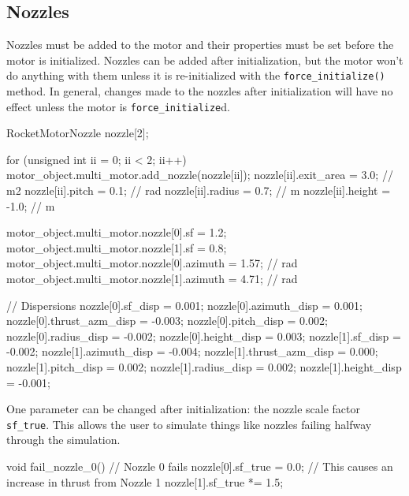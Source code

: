 \documentclass[11pt,fleqn]{report}
\begin{document}
\subsection{Nozzles}
\par Nozzles must be added to the motor and their properties must be set before the motor is initialized. Nozzles can be added after initialization, but the motor won't do anything  with them unless it is re-initialized with the \verb|force_initialize()| method. In general, changes made to the nozzles after initialization will have no effect unless the motor is \verb|force_initialize|d.
\begin{code}
RocketMotorNozzle nozzle[2];

for (unsigned int ii = 0; ii < 2; ii++) {
  motor_object.multi_motor.add_nozzle(nozzle[ii]);
  nozzle[ii].exit_area =  3.0; // m2
  nozzle[ii].pitch     =  0.1; // rad
  nozzle[ii].radius    =  0.7; // m
  nozzle[ii].height    = -1.0; // m
}

motor_object.multi_motor.nozzle[0].sf = 1.2;
motor_object.multi_motor.nozzle[1].sf = 0.8;
motor_object.multi_motor.nozzle[0].azimuth = 1.57; // rad
motor_object.multi_motor.nozzle[1].azimuth = 4.71; // rad

// Dispersions
nozzle[0].sf_disp         =  0.001;
nozzle[0].azimuth_disp    =  0.001;
nozzle[0].thrust_azm_disp = -0.003;
nozzle[0].pitch_disp      =  0.002;
nozzle[0].radius_disp     = -0.002;
nozzle[0].height_disp     =  0.003;
nozzle[1].sf_disp         = -0.002;
nozzle[1].azimuth_disp    = -0.004;
nozzle[1].thrust_azm_disp =  0.000;
nozzle[1].pitch_disp      =  0.002;
nozzle[1].radius_disp     =  0.002;
nozzle[1].height_disp     = -0.001;
\end{code}
\par One parameter can be changed after initialization: the nozzle scale factor \verb|sf_true|. This allows the user to simulate things like nozzles failing halfway through the simulation.
\begin{code}
void fail_nozzle_0() {
  // Nozzle 0 fails
  nozzle[0].sf_true = 0.0;
  // This causes an increase in thrust from Nozzle 1
  nozzle[1].sf_true *= 1.5;
}
\end{code}
\end{document}
